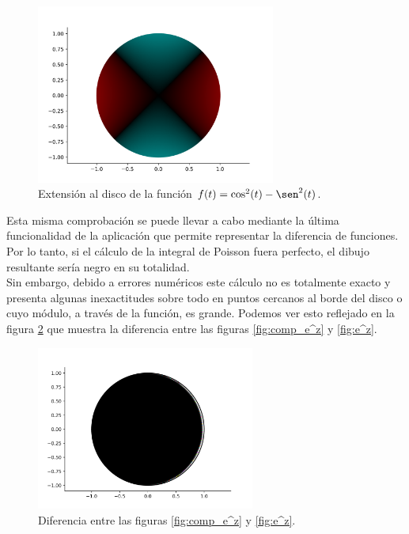 \begin{figure}[!htbp]
    \centering
    \includegraphics[width=0.7\textwidth]{../Aplicacion/cos^2(t)-sen^2(t).png}
    \caption{Extensión al disco de la función $f(t) = \cos^2(t) - \sen^2(t)$.}
    \label{fig:comparacion4}
\end{figure}

Esta misma comprobación se puede llevar a cabo mediante la última funcionalidad de la aplicación que permite representar la diferencia de funciones. Por lo tanto, si el cálculo de la integral de Poisson fuera perfecto, el dibujo resultante sería negro en su totalidad. \\

Sin embargo, debido a errores numéricos este cálculo no es totalmente exacto y presenta algunas inexactitudes sobre todo en puntos cercanos al borde del disco o cuyo módulo, a través de la función, es grande. Podemos ver esto reflejado en la figura \ref{fig:diferencia} que muestra la diferencia entre las figuras \ref{fig:comp_e^z} y \ref{fig:e^z}. \\

\begin{figure}[!htbp]
    \centering
    \includegraphics[width=0.64\textwidth]{../Aplicacion/diff_e^z.png}
    \caption{Diferencia entre las figuras \ref{fig:comp_e^z} y \ref{fig:e^z}.}
    \label{fig:diferencia}
\end{figure}

